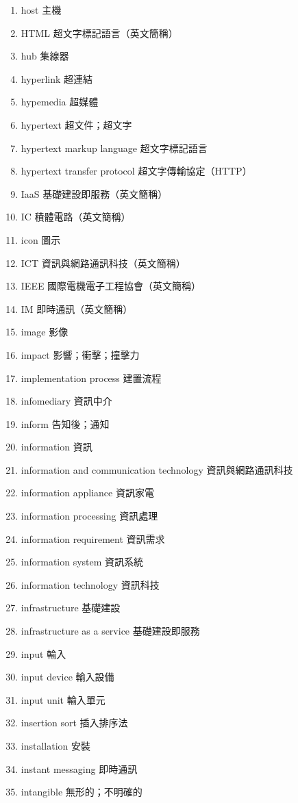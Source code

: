 \begin{enumerate}
  \item host 主機
  \item HTML 超文字標記語言（英文簡稱）
  \item hub 集線器
  \item hyperlink 超連結
  \item hypemedia 超媒體
  \item hypertext 超文件；超文字
  \item hypertext markup language 超文字標記語言
  \item hypertext transfer protocol 超文字傳輸協定（HTTP）
  \item IaaS 基礎建設即服務（英文簡稱）
  \item IC 積體電路（英文簡稱）
  \item icon 圖示
  \item ICT 資訊與網路通訊科技（英文簡稱）
  \item IEEE 國際電機電子工程協會（英文簡稱）
  \item IM 即時通訊（英文簡稱）
  \item image 影像
  \item impact 影響；衝擊；撞擊力
  \item implementation process 建置流程
  \item infomediary 資訊中介
  \item inform 告知後；通知
  \item information 資訊
  \item information and communication technology 資訊與網路通訊科技
  \item information appliance 資訊家電
  \item information processing 資訊處理
  \item information requirement 資訊需求
  \item information system 資訊系統
  \item information technology 資訊科技
  \item infrastructure 基礎建設
  \item infrastructure as a service 基礎建設即服務
  \item input 輸入
  \item input device 輸入設備
  \item input unit 輸入單元
  \item insertion sort 插入排序法
  \item installation 安裝
  \item instant messaging 即時通訊
  \item intangible 無形的；不明確的

\end{enumerate}
